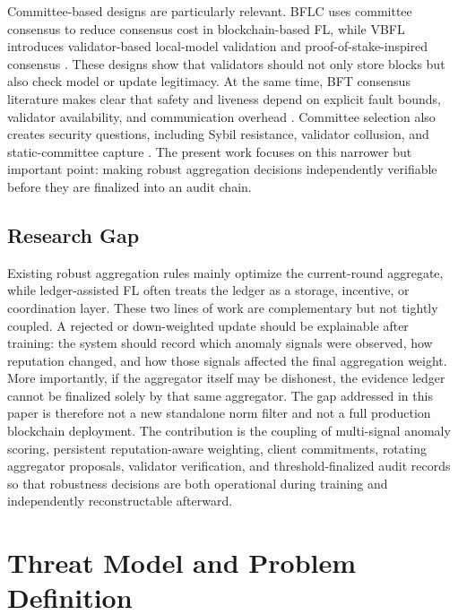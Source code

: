 \documentclass[preprint,authoryear,12pt]{elsarticle}
\begin{document}
Committee-based designs are particularly relevant. BFLC uses committee consensus to reduce consensus cost in blockchain-based FL, while VBFL introduces validator-based local-model validation and proof-of-stake-inspired consensus \citep{li2020bflc,chen2021vbfl}. These designs show that validators should not only store blocks but also check model or update legitimacy. At the same time, BFT consensus literature makes clear that safety and liveness depend on explicit fault bounds, validator availability, and communication overhead \citep{zhang2022bftsurvey,alqahtani2021bottlenecks}. Committee selection also creates security questions, including Sybil resistance, validator collusion, and static-committee capture \citep{rajab2020sybil}. The present work focuses on this narrower but important point: making robust aggregation decisions independently verifiable before they are finalized into an audit chain.

\subsection{Research Gap}

Existing robust aggregation rules mainly optimize the current-round aggregate, while ledger-assisted FL often treats the ledger as a storage, incentive, or coordination layer. These two lines of work are complementary but not tightly coupled. A rejected or down-weighted update should be explainable after training: the system should record which anomaly signals were observed, how reputation changed, and how those signals affected the final aggregation weight. More importantly, if the aggregator itself may be dishonest, the evidence ledger cannot be finalized solely by that same aggregator. The gap addressed in this paper is therefore not a new standalone norm filter and not a full production blockchain deployment. The contribution is the coupling of multi-signal anomaly scoring, persistent reputation-aware weighting, client commitments, rotating aggregator proposals, validator verification, and threshold-finalized audit records so that robustness decisions are both operational during training and independently reconstructable afterward.

\section{Threat Model and Problem Definition}
\end{document}

